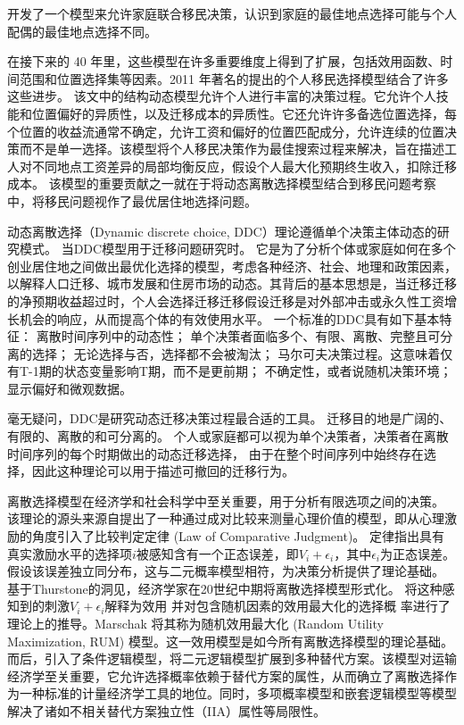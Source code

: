 \documentclass[a4paper, zihao=-4, fontset = mac, oneside]{ctexbook} %
\begin{document}
\textcite{mincerFamilyMigrationDecisions1978} 开发了一个模型来允许家庭联合移民决策，认识到家庭的最佳地点选择可能与个人配偶的最佳地点选择不同。

在接下来的 40 年里，这些模型在许多重要维度上得到了扩展，包括效用函数、时间范围和位置选择集等因素。2011 年著名的\textcite{kennanEffectExpectedIncome2011}提出的个人移民选择模型结合了许多这些进步。
该文中的结构动态模型允许个人进行丰富的决策过程。它允许个人技能和位置偏好的异质性，以及迁移成本的异质性。它还允许许多备选位置选择，每个位置的收益流通常不确定，允许工资和偏好的位置匹配成分，允许连续的位置决策而不是单一选择。该模型将个人移民决策作为最佳搜索过程来解决，旨在描述工人对不同地点工资差异的局部均衡反应，假设个人最大化预期终生收入，扣除迁移成本。
该模型的重要贡献之一就在于将动态离散选择模型结合到移民问题考察中，将移民问题视作了最优居住地选择问题。

动态离散选择（Dynamic discrete choice, DDC）理论遵循单个决策主体动态的研究模式。
当DDC模型用于迁移问题研究时。
它是为了分析个体或家庭如何在多个创业居住地之间做出最优化选择的模型，考虑各种经济、社会、地理和政策因素，以解释人口迁移、城市发展和住房市场的动态。其背后的基本思想是，当迁移迁移的净预期收益超过时，个人会选择迁移迁移假设迁移是对外部冲击或永久性工资增长机会的响应，从而提高个体的有效使用水平。
一个标准的DDC具有如下基本特征：
离散时间序列中的动态性；
单个决策者面临多个、有限、离散、完整且可分离的选择；
无论选择与否，选择都不会被淘汰；
马尔可夫决策过程。这意味着仅有T-1期的状态变量影响T期，而不是更前期；
不确定性，或者说随机决策环境；
显示偏好和微观数据。

毫无疑问，DDC是研究动态迁移决策过程最合适的工具。
迁移目的地是广阔的、有限的、离散的和可分离的。
个人或家庭都可以视为单个决策者，决策者在离散时间序列的每个时期做出的动态迁移选择，
由于在整个时间序列中始终存在选择，因此这种理论可以用于描述可撤回的迁移行为。

离散选择模型在经济学和社会科学中至关重要，用于分析有限选项之间的决策。
该理论的源头来源自\textcite{thurstoneLawComparativeJudgment1927}提出了一种通过成对比较来测量心理价值的模型，即从心理激励的角度引入了比较判定定律 (Law of Comparative Judgment)。
定律指出具有真实激励水平的选择项$i$被感知含有一个正态误差，即$V_i+\epsilon_i$，其中\(\epsilon_i\)为正态误差。假设该误差独立同分布，这与二元概率模型相符，为决策分析提供了理论基础。
基于Thurstone的洞见，经济学家在20世纪中期将离散选择模型形式化。
\textcite{marschakBinarychoiceConstraintsRandom1960}将这种感知到的刺激$V_i+\epsilon_i$解释为效用 并对包含随机因素的效用最大化的选择概 率进行了理论上的推导。Marschak 将其称为随机效用最大化 (Random Utility Maximization, RUM) 模型。这一效用模型是如今所有离散选择模型的理论基础。
而后，\textcite{mcfaddenConditionalLogitAnalysis1973}引入了条件逻辑模型，将二元逻辑模型扩展到多种替代方案。该模型对运输经济学至关重要，它允许选择概率依赖于替代方案的属性，从而确立了离散选择作为一种标准的计量经济学工具的地位。同时，多项概率模型和嵌套逻辑模型等模型解决了诸如不相关替代方案独立性（IIA）属性等局限性。
\end{document}
